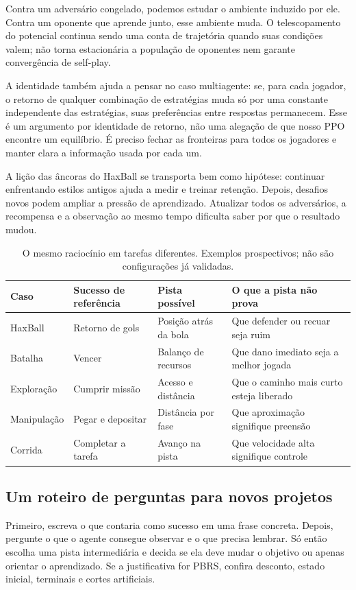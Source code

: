 \documentclass[11pt,a4paper]{article}
\begin{document}
Contra um adversário congelado, podemos estudar o ambiente induzido por ele. Contra um oponente que aprende junto, esse ambiente muda. O telescopamento do potencial continua sendo uma conta de trajetória quando suas condições valem; não torna estacionária a população de oponentes nem garante convergência de self-play.

A identidade também ajuda a pensar no caso multiagente: se, para cada jogador, o retorno de qualquer combinação de estratégias muda só por uma constante independente das estratégias, suas preferências entre respostas permanecem. Esse é um argumento por identidade de retorno, não uma alegação de que nosso PPO encontre um equilíbrio. É preciso fechar as fronteiras para todos os jogadores e manter clara a informação usada por cada um.

A lição das âncoras do HaxBall se transporta bem como hipótese: continuar enfrentando estilos antigos ajuda a medir e treinar retenção. Depois, desafios novos podem ampliar a pressão de aprendizado. Atualizar todos os adversários, a recompensa e a observação ao mesmo tempo dificulta saber por que o resultado mudou.

\begin{table}[htbp]\centering\small
\caption{O mesmo raciocínio em tarefas diferentes. Exemplos prospectivos; não são configurações já validadas.}
\begin{tabularx}{\textwidth}{@{}lYYY@{}}\toprule
Caso & Sucesso de referência & Pista possível & O que a pista não prova\\\midrule
HaxBall & Retorno de gols & Posição atrás da bola & Que defender ou recuar seja ruim\\
Batalha & Vencer & Balanço de recursos & Que dano imediato seja a melhor jogada\\
Exploração & Cumprir missão & Acesso e distância & Que o caminho mais curto esteja liberado\\
Manipulação & Pegar e depositar & Distância por fase & Que aproximação signifique preensão\\
Corrida & Completar a tarefa & Avanço na pista & Que velocidade alta signifique controle\\\bottomrule
\end{tabularx}
\end{table}

\subsection{Um roteiro de perguntas para novos projetos}
Primeiro, escreva o que contaria como sucesso em uma frase concreta. Depois, pergunte o que o agente consegue observar e o que precisa lembrar. Só então escolha uma pista intermediária e decida se ela deve mudar o objetivo ou apenas orientar o aprendizado. Se a justificativa for PBRS, confira desconto, estado inicial, terminais e cortes artificiais.
\end{document}
